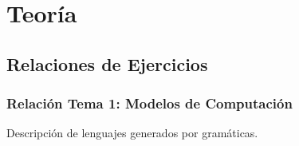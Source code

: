 \documentclass[12pt]{book} %
\begin{document}
\newpage
\thispagestyle{empty}
\mbox{}

\newpage
\thispagestyle{empty}
\mbox{}






\tableofcontents
\clearpage
\thispagestyle{empty} %

%
%

\part{Teoría}



\chapter{Relaciones de Ejercicios}

\hypertarget{relaciuxf3n-tema-1-modelos-de-computaciuxf3n}{%
\section{Relación Tema 1: Modelos de
Computación}\label{relaciuxf3n-tema-1-modelos-de-computaciuxf3n}}

\begin{ejercicio}
Descripción de lenguajes generados por gramáticas.
\end{ejercicio}
\end{document}
